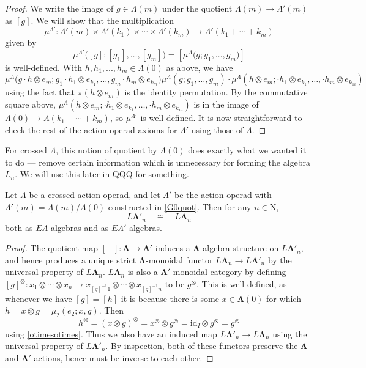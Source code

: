 \documentclass{amsbook} %
\newcommand{\id}{\textrm{id}}
\newcommand{\ML}{\mathbf{\Lambda}}
\numberwithin{section}{chapter}
\begin{document}
\begin{proof}
We write the image of $g \in \Lambda(m)$ under the quotient $\Lambda(m) \to \Lambda'(m)$ as $[g]$. We will show that the multiplication
\[
\mu^{\Lambda'}:\Lambda'(m) \times \Lambda'(k_1) \times \cdots \times \Lambda'(k_m) \to \Lambda'(k_1 + \cdots + k_m)
\]
given by 
\[
\mu^{\Lambda'}\Big( [g]; [g_1], \ldots , [g_m] \Big) = [\mu^{\Lambda}\Big(g; g_1, \ldots, g_m \Big)]
\]
is well-defined. With $h, h_1, ..., h_m \in \Lambda(0)$ as above, we have
\[
\mu^{\Lambda}\Big(g \cdot h \otimes e_m; g_1\cdot h_1 \otimes e_{k_1}, \ldots, g_m\cdot h_m \otimes e_{k_m} \Big) \mu^{\Lambda}(g; g_1, \ldots, g_m) \cdot \mu^{\Lambda}(h \otimes e_m; \cdot h_1 \otimes e_{k_1}, \ldots, \cdot h_m \otimes e_{k_m})
\]
using the fact that $\pi(h \otimes e_m)$ is the identity permutation. By the commutative square above, $\mu^{\Lambda}(h \otimes e_m; \cdot h_1 \otimes e_{k_1}, \ldots, \cdot h_m \otimes e_{k_m})$ is in the image of $\Lambda(0) \to \Lambda(k_1 + \cdots + k_m)$, so $\mu^{\Lambda'}$ is well-defined. It is now straightforward to check the rest of the action operad axioms for $\Lambda'$ using those of $\Lambda$.
\end{proof}

For crossed $\Lambda$, this notion of quotient by $\Lambda(0)$ does exactly what we wanted it to do --- remove certain information which is unnecessary for forming the algebra $L_n$. We will use this later in QQQ for something.

\begin{prop} \label{noscalarcross} Let $\Lambda$ be a crossed action operad, and let $\Lambda'$ be the action operad with $\Lambda'(m) = \Lambda(m)/\Lambda(0)$ constructed in \cref{G0quot}. Then for any $n \in \mathrm{N}$,
\[ L\ML'_n \quad \cong \quad L\ML_n \]
both as $E\Lambda$-algebras and as $E\Lambda'$-algebras.  
\end{prop}
\begin{proof}

The quotient map $[-]:\ML \to \ML'$ induces a $\ML$-algebra structure on $L\ML'_n$, and hence produces a unique strict $\ML$-monoidal functor $L\ML_n \to L\ML'_n$ by the universal property of $L\ML_n$. $L\ML_n$ is also a $\ML'$-monoidal category by defining $[g]^{\otimes} : x_1 \otimes \cdots \otimes x_n \to x_{[g]^{-1}1} \otimes \cdots \otimes x_{[g]^{-1}n}$ to be $g^{\otimes}$. This is well-defined, as whenever we have $[g] = [h]$ it is because there is some $x \in \ML(0)$ for which $h = x \otimes g = \mu_2(e_2; x, g)$. Then
\[
h^{\otimes} = (x \otimes g)^{\otimes} = x^{\otimes} \otimes g^{\otimes} = \id_I \otimes g^{\otimes} = g^{\otimes}
\]
using \cref{otimesotimes}. Thus we also have an induced map $L\ML'_n \to L\ML_n$ using the universal property of $L\ML'_n$. By inspection, both of these functors preserve the $\ML$- and $\ML'$-actions, hence must be inverse to each other.
\end{proof}
\end{document}
